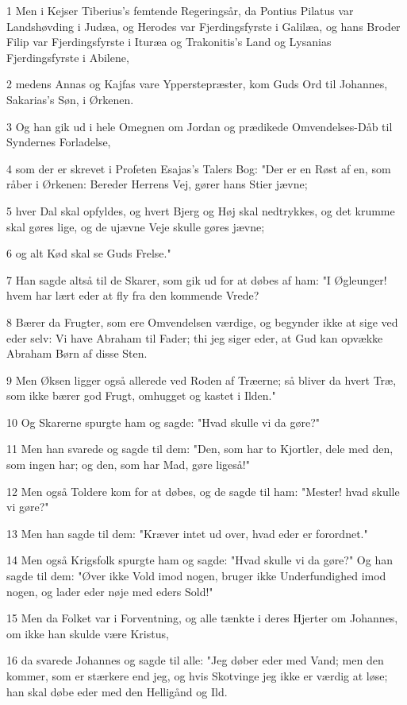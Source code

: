 \par 1 Men i Kejser Tiberius's femtende Regeringsår, da Pontius Pilatus var Landshøvding i Judæa, og Herodes var Fjerdingsfyrste i Galilæa, og hans Broder Filip var Fjerdingsfyrste i Ituræa og Trakonitis's Land og Lysanias Fjerdingsfyrste i Abilene,
\par 2 medens Annas og Kajfas vare Ypperstepræster, kom Guds Ord til Johannes, Sakarias's Søn, i Ørkenen.
\par 3 Og han gik ud i hele Omegnen om Jordan og prædikede Omvendelses-Dåb til Syndernes Forladelse,
\par 4 som der er skrevet i Profeten Esajas's Talers Bog: "Der er en Røst af en, som råber i Ørkenen: Bereder Herrens Vej, gører hans Stier jævne;
\par 5 hver Dal skal opfyldes, og hvert Bjerg og Høj skal nedtrykkes, og det krumme skal gøres lige, og de ujævne Veje skulle gøres jævne;
\par 6 og alt Kød skal se Guds Frelse."
\par 7 Han sagde altså til de Skarer, som gik ud for at døbes af ham: "I Øgleunger! hvem har lært eder at fly fra den kommende Vrede?
\par 8 Bærer da Frugter, som ere Omvendelsen værdige, og begynder ikke at sige ved eder selv: Vi have Abraham til Fader; thi jeg siger eder, at Gud kan opvække Abraham Børn af disse Sten.
\par 9 Men Øksen ligger også allerede ved Roden af Træerne; så bliver da hvert Træ, som ikke bærer god Frugt, omhugget og kastet i Ilden."
\par 10 Og Skarerne spurgte ham og sagde: "Hvad skulle vi da gøre?"
\par 11 Men han svarede og sagde til dem: "Den, som har to Kjortler, dele med den, som ingen har; og den, som har Mad, gøre ligeså!"
\par 12 Men også Toldere kom for at døbes, og de sagde til ham: "Mester! hvad skulle vi gøre?"
\par 13 Men han sagde til dem: "Kræver intet ud over, hvad eder er forordnet."
\par 14 Men også Krigsfolk spurgte ham og sagde: "Hvad skulle vi da gøre?" Og han sagde til dem: "Øver ikke Vold imod nogen, bruger ikke Underfundighed imod nogen, og lader eder nøje med eders Sold!"
\par 15 Men da Folket var i Forventning, og alle tænkte i deres Hjerter om Johannes, om ikke han skulde være Kristus,
\par 16 da svarede Johannes og sagde til alle: "Jeg døber eder med Vand; men den kommer, som er stærkere end jeg, og hvis Skotvinge jeg ikke er værdig at løse; han skal døbe eder med den Helligånd og Ild.
